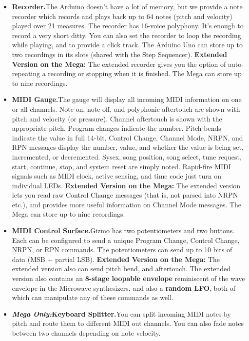 \documentclass{article}
\begin{document}
\begin{itemize}
\item {\bf Recorder.}\quad The Arduino doesn't have a lot of memory, but we provide a note recorder which records and plays back up to 64 notes (pitch and velocity) played over 21 measures. The recorder has 16-voice polyphony.   It's enough to record a very short ditty.  You can also set the recorder to loop the recording while playing, and to provide a click track.  The Arduino Uno can store up to two recordings in its slots (shared with the Step Sequencer).   {\bf Extended Version on the Mega:}  The extended recorder gives you the option of auto-repeating a recording or stopping when it is finished.  The Mega can store up to nine recordings.

\item {\bf MIDI Gauge.}\quad The gauge will display all incoming MIDI information on one or all channels.  Note on, note off, and polyphonic aftertouch are shown with pitch and velocity (or pressure).  Channel aftertouch is shown with the appropriate pitch.  Program changes indicate the number.  Pitch bends indicate the value in full 14-bit.  Control Change, Channel Mode, NRPN, and RPN messages display the number, value, and whether the value is being set, incremented, or decremented.  Sysex, song position, song select, tune request, start, continue, stop, and system reset are simply noted.  Rapid-fire MIDI signals such as MIDI clock, active sensing, and time code just turn on individual LEDs. {\bf Extended Version on the Mega:}  The extended version lets you read raw Control Change messages (that is, not parsed into NRPN etc.), and provides more useful information on Channel Mode messages.  The Mega can store up to nine recordings.

\item {\bf MIDI Control Surface.}\quad Gizmo has two potentiometers and two buttons.  Each can be configured to send a unique Program Change, Control Change, NRPN, or RPN commands.  The potentiometers can send up to 10 bits of data (MSB + partial LSB).   {\bf Extended Version on the Mega:}  The extended version also can send pitch bend, and aftertouch.%
The extended version also contains an {\bf 8-stage loopable envelope} reminiscent of the wave envelope in the Microwave synthesizers, and also a {\bf random LFO}, both of which can manipulate any of these commands as well.

\item {\bf \textit{Mega Only:}\quad Keyboard Splitter.}\quad You can split incoming MIDI notes by pitch and route them to different MIDI out channels.  You can also fade notes between two channels depending on note velocity.


\end{itemize}
\end{document}
